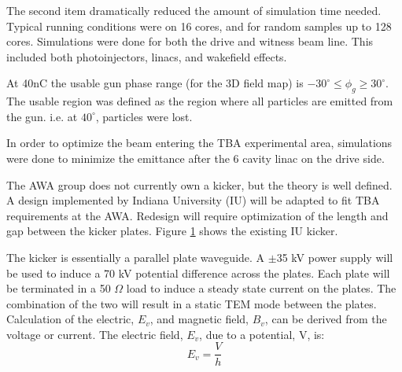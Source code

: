 \documentclass{iitthesis}
\begin{document}
The second item dramatically reduced the amount of simulation time needed. 
Typical running conditions were on 16 cores, and for random samples up to 128 cores.
 \label{sec:opt}
 \label{sec:simulations}
Simulations were done for both the drive and witness beam line. 
This included both photoinjectors, linacs, and wakefield effects. 

At 40nC the usable gun phase range (for the 3D field map) is 
$-30^\circ \le \phi_g \ge 30^\circ$. The usable region was defined 
as the region where all particles are emitted from the gun. 
i.e. at $40^\circ$, particles were lost.  

 \label{sec:pareto}
In order to optimize the beam entering the TBA experimental area, 
simulations were done to minimize the emittance after the 6 cavity linac
on the drive side. 

The AWA group does not currently own a kicker, but the theory is well defined. 
A design implemented by Indiana University (IU) \cite{iukicker}
will be adapted to fit TBA requirements at the AWA. Redesign will require optimization
of the length and gap between the kicker plates. Figure \ref{fig:IUkicker} shows the existing IU kicker.
\begin{figure}[h]
	\begin{center}
		\label{fig:IUkicker}
	\end{center}
\end{figure}
The kicker is essentially a parallel plate waveguide. 
A $\pm$35 kV power supply will be used to induce a 70 kV potential difference 
across the plates. Each plate will be terminated in a 50 $\Omega$ load to induce a steady 
state current on the plates. The combination of the two will result in a static TEM mode 
between the plates. Calculation of the electric, $E_v$, and magnetic field, $B_v$,
can be derived from the voltage or current. The electric field, $E_v$, due to a potential, V, is: 
\begin{equation}
E_v=\frac{V}{h}
\end{equation}
\end{document}
